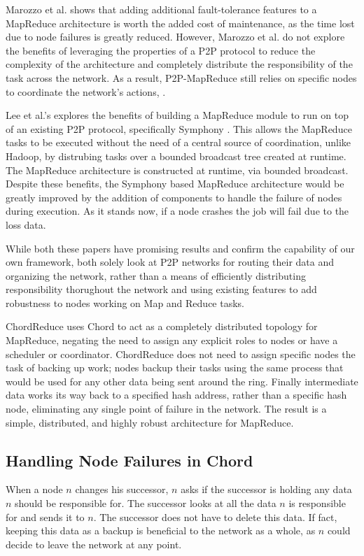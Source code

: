 \documentclass[10pt, conference, compsocconf]{IEEEtran}
\begin{document}
Marozzo et al. \cite{marozzo2012p2p} shows that adding additional fault-tolerance features to a MapReduce architecture is worth the added cost of maintenance, as the time lost due to node failures is greatly reduced.  However, Marozzo et al. do not explore the benefits of leveraging the properties of a P2P protocol to reduce the complexity of the architecture and completely distribute the responsibility of the task across the network.  As a result, P2P-MapReduce still relies on specific nodes to coordinate the network's actions,  .

Lee et al.'s \cite{leemap} explores the benefits of building a MapReduce module to run on top of an existing P2P protocol, specifically Symphony \cite{symphony}.  This allows the MapReduce tasks to be executed without the need of a central source of coordination, unlike Hadoop, by distrubing tasks over a bounded broadcast tree created at runtime.  The MapReduce architecture is constructed at runtime, via bounded broadcast. Despite these benefits, the Symphony based MapReduce architecture would be greatly improved by the addition of components to handle the failure of nodes during execution.  As it stands now, if a node crashes the job will fail due to the loss data.


While both these papers have promising results and confirm the capability of our own framework, both solely look at P2P networks for routing their data and organizing the network, rather than a means of efficiently distributing responsibility thorughout the network and using existing features to add robustness to nodes working on Map and Reduce tasks.  

ChordReduce uses Chord to act as a completely distributed topology for MapReduce, negating the need to assign any explicit roles to nodes or have a scheduler or coordinator.  ChordReduce does not need to assign specific nodes the task of backing up work; nodes backup their tasks using the same process that would be used for any other data being sent around the ring.  Finally intermediate data works its way back to a specified hash address, rather than a specific hash node, eliminating any single point of failure in the network.  The result is a simple, distributed, and highly robust architecture for MapReduce.




\subsection{Handling Node Failures in Chord}
When a node $n$ changes his successor, $n$ asks if the successor is holding any data $n$ should be responsible for.  The successor looks at all the data $n$ is responsible for and sends it  to $n$.  The successor does not have to delete this data. If fact, keeping this data as a backup is beneficial to the network as a whole, as $n$ could decide to leave the network at any point. 
\end{document}

